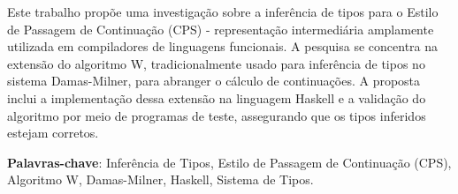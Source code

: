 
\setlength{\absparsep}{18pt}    %
\begin{resumo}
  Este trabalho propõe uma investigação sobre a inferência de tipos para o Estilo de
  Passagem de Continuação (CPS) - representação intermediária amplamente utilizada
  em compiladores de linguagens funcionais. A pesquisa se concentra na extensão do
  algoritmo W, tradicionalmente usado para inferência de tipos no sistema Damas-Milner,
  para abranger o cálculo de continuações. A proposta inclui a implementação dessa
  extensão na linguagem Haskell e a validação do algoritmo por meio de programas de
  teste, assegurando que os tipos inferidos estejam corretos.

  \textbf{Palavras-chave}: Inferência de Tipos, Estilo de Passagem de Continuação
  (CPS), Algoritmo W, Damas-Milner, Haskell, Sistema de Tipos.
\end{resumo}
